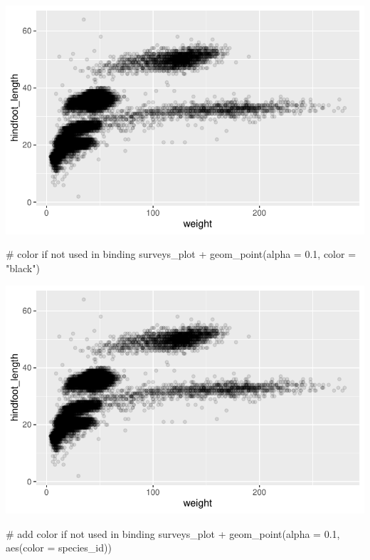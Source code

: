 \documentclass[
  letterpaper,
  DIV=11,
  numbers=noendperiod]{scrreprt}
\newenvironment{Shaded}{\begin{snugshade}}{\end{snugshade}}
\newcommand{\AttributeTok}[1]{\textcolor[rgb]{0.40,0.45,0.13}{#1}}
\newcommand{\CommentTok}[1]{\textcolor[rgb]{0.37,0.37,0.37}{#1}}
\newcommand{\FloatTok}[1]{\textcolor[rgb]{0.68,0.00,0.00}{#1}}
\newcommand{\FunctionTok}[1]{\textcolor[rgb]{0.28,0.35,0.67}{#1}}
\newcommand{\NormalTok}[1]{\textcolor[rgb]{0.00,0.23,0.31}{#1}}
\newcommand{\SpecialCharTok}[1]{\textcolor[rgb]{0.37,0.37,0.37}{#1}}
\newcommand{\StringTok}[1]{\textcolor[rgb]{0.13,0.47,0.30}{#1}}
\begin{document}
\includegraphics{src/notebooks/r_files/figure-pdf/unnamed-chunk-49-2.pdf}

\begin{Shaded}
\begin{Highlighting}[]
\CommentTok{\# color if not used in binding}
\NormalTok{surveys\_plot }\SpecialCharTok{+} \FunctionTok{geom\_point}\NormalTok{(}\AttributeTok{alpha =} \FloatTok{0.1}\NormalTok{, }\AttributeTok{color =} \StringTok{"black"}\NormalTok{)}
\end{Highlighting}
\end{Shaded}

\includegraphics{src/notebooks/r_files/figure-pdf/unnamed-chunk-49-3.pdf}

\begin{Shaded}
\begin{Highlighting}[]
\CommentTok{\# add color if not used in binding}
\NormalTok{surveys\_plot }\SpecialCharTok{+} \FunctionTok{geom\_point}\NormalTok{(}\AttributeTok{alpha =} \FloatTok{0.1}\NormalTok{, }\FunctionTok{aes}\NormalTok{(}\AttributeTok{color =}\NormalTok{ species\_id))}
\end{Highlighting}
\end{Shaded}
\end{document}
